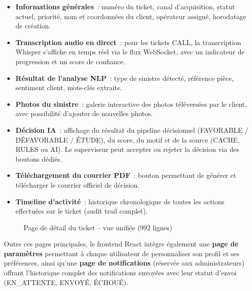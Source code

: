 \begin{itemize}
    \item \textbf{Informations g\'{e}n\'{e}rales}~: num\'{e}ro du ticket, canal d'acquisition, statut actuel, priorit\'{e}, nom et coordonn\'{e}es du client, op\'{e}rateur assign\'{e}, horodatage de cr\'{e}ation.
    \item \textbf{Transcription audio en direct}~: pour les tickets CALL, la transcription Whisper s'affiche en temps r\'{e}el via le flux WebSocket, avec un indicateur de progression et un score de confiance.
    \item \textbf{R\'{e}sultat de l'analyse NLP}~: type de sinistre d\'{e}tect\'{e}, r\'{e}f\'{e}rence pi\`{e}ce, sentiment client, mots-cl\'{e}s extraits.
    \item \textbf{Photos du sinistre}~: galerie interactive des photos t\'{e}l\'{e}vers\'{e}es par le client, avec possibilit\'{e} d'ajouter de nouvelles photos.
    \item \textbf{D\'{e}cision IA}~: affichage du r\'{e}sultat du pipeline d\'{e}cisionnel (FAVORABLE / D\'{E}FAVORABLE / \'{E}TUDE), du score, du motif et de la source (CACHE, RULES ou AI). Le superviseur peut accepter ou rejeter la d\'{e}cision via des boutons d\'{e}di\'{e}s.
    \item \textbf{T\'{e}l\'{e}chargement du courrier PDF}~: bouton permettant de g\'{e}n\'{e}rer et t\'{e}l\'{e}charger le courrier officiel de d\'{e}cision.
    \item \textbf{Timeline d'activit\'{e}}~: historique chronologique de toutes les actions effectu\'{e}es sur le ticket (audit trail complet).
\end{itemize}

\begin{figure}[H]
    \centering
    \caption{Page de d\'{e}tail du ticket -- vue unifi\'{e}e (992 lignes)}
    \label{fig:ticket_detail}
\end{figure}

Outre ces pages principales, le frontend React int\`{e}gre \'{e}galement une \textbf{page de param\`{e}tres} permettant \`{a} chaque utilisateur de personnaliser son profil et ses pr\'{e}f\'{e}rences, ainsi qu'une \textbf{page de notifications} (r\'{e}serv\'{e}e aux administrateurs) offrant l'historique complet des notifications envoy\'{e}es avec leur statut d'envoi (EN\_ATTENTE, ENVOY\'{E}, \'{E}CHOU\'{E}).


